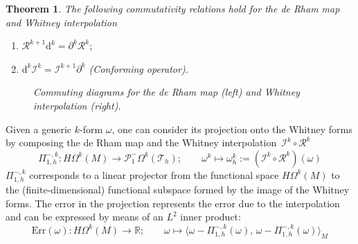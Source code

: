 \documentclass{elsarticle}
\newtheorem{theorem}{Theorem}
\renewcommand\d{\ensuremath{\mathrm{d}}}
\newcommand{\inpr}[3][]{\ensuremath{\langle #2, \, #3 \rangle_{#1}}}
\begin{document}
\begin{theorem}\cite[Section IV.27]{whitney1957}\label{th:cd_RI}
The following commutativity relations hold for the de Rham map and Whitney interpolation 

\begin{enumerate}
\item $\mathcal{R}^{k+1} \d^k = \partial^k \mathcal{R}^k;$
\item $\d^k \mathcal{I}^k = \mathcal{I}^{k+1} \partial^k$ (Conforming operator).
\end{enumerate}
\begin{figure}[h]
\centering
{} \hspace{1cm}
\caption{Commuting diagrams for the de Rham map (left) and  Whitney interpolation (right).}
\label{fig:cd_RI}
\end{figure}

\end{theorem}

Given a generic $k$-form $\omega$, one can consider its projection onto the Whitney forms  by composing the de Rham map   and the Whitney interpolation~$\mathcal{I}^k \circ \mathcal{R}^k$~\cite{bochev2006}
\begin{equation}
\Pi_{1, h}^{-, k}:H\Omega^k(M) \rightarrow 
 \mathcal{P}^{-}_1\Omega^{k}(\mathcal{T}_h) 
; \qquad \omega^k \mapsto \omega_h^k:=(\mathcal{I}^k \circ \mathcal{R}^k )(\omega)
\end{equation}
$\Pi^{-, k}_{1, h}$ corresponds to a linear projector from the functional space $H\Omega^k(M) $ to the (finite-dimensional) functional subspace formed by the image of the Whitney forms. The error in the projection represents the error due to the interpolation and can be expressed by means of an $L^2$ inner product:
\begin{equation}\label{eq:L2err}
   \text{Err}(\omega):
H\Omega^k(M) \rightarrow \mathbb{R} ; \qquad 
\omega \mapsto \inpr[M]{\omega-\Pi_{1, h}^{-, k}(\omega)}{\omega-\Pi_{1, h}^{-, k}(\omega)} 
\end{equation}
\end{document}
